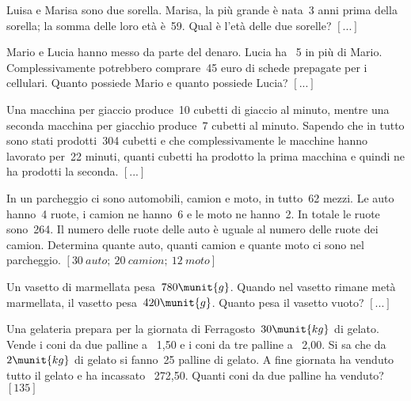 \begin{htmulticols}{2}
\begin{esercizio}
 \label{ese:22.97}
Luisa e Marisa sono due sorella. Marisa, la più grande è nata~3 anni
prima della sorella; la somma delle loro età è~59. Qual è
l'età delle due sorelle?
\hfill \(\left[...\right]\)
\end{esercizio}

\begin{esercizio}
 \label{ese:22.98}
Mario e Lucia hanno messo da parte del denaro. Lucia ha {\officialeuro}~5
in più di Mario. Complessivamente potrebbero comprare~45 euro di
schede prepagate per i cellulari. Quanto possiede Mario e quanto
possiede Lucia?
\hfill \(\left[...\right]\)
\end{esercizio}

\begin{esercizio}
 \label{ese:22.99}
Una macchina per giaccio produce~10 cubetti di giaccio al minuto, mentre
una seconda macchina per giacchio produce~7 cubetti al minuto. Sapendo
che in tutto sono stati prodotti~304 cubetti e che complessivamente le
macchine hanno lavorato per~22 minuti, quanti cubetti ha prodotto la
prima macchina e quindi ne ha prodotti la seconda.
\hfill \(\left[...\right]\)
\end{esercizio}

\begin{esercizio}[*]
 \label{ese:22.100}
In un parcheggio ci sono automobili, camion e moto, in tutto~62 mezzi.
Le auto hanno~4 ruote, i camion ne hanno~6 e le moto ne hanno~2.
In totale le ruote sono~264. Il numero delle ruote delle auto è uguale
al numero delle ruote dei camion. Determina quante auto, quanti camion
e quante moto ci sono nel parcheggio.
\hfill \(\left[30~auto;~20~camion;~12~moto\right]\)
\end{esercizio}

\begin{esercizio}
 \label{ese:22.101}
Un vasetto di marmellata pesa~\(780\munit{g}\). 
Quando nel vasetto rimane metà marmellata, 
il vasetto pesa~\(420\munit{g}\). 
Quanto pesa il vasetto vuoto?
\hfill \(\left[...\right]\)
\end{esercizio}


\begin{esercizio}[*]
 \label{ese:22.102}
Una gelateria prepara per la giornata di Ferragosto~\(30\munit{kg}\) di
gelato. Vende i coni da due palline a {\officialeuro}~1,50 e i coni da tre
palline a {\officialeuro}~2,00. Si sa che da~\(2\munit{kg}\) di gelato si 
fanno~25
palline di gelato. A fine giornata ha venduto tutto il gelato e ha
incassato {\officialeuro}~272,50. Quanti coni da due palline ha venduto?
\hfill \(\left[135\right]\)
\end{esercizio}


\end{htmulticols}
